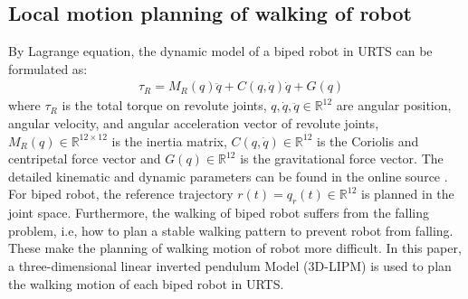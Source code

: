 \documentclass[journal,12pt,onecolumn,draftclsnofoot,]{IEEEtran}
\begin{document}


\subsection{Local motion planning of walking of robot}
By Lagrange equation, the dynamic model of a biped robot in URTS can be formulated as:
\begin{equation} \label{eq:robot} 
    \begin{split}
        & \tau_R = M_R(q)\ddot{q} + C(q,\dot{q})\dot{q} + G(q)    
    \end{split}
\end{equation}
where $\tau_R$ is the total torque on revolute joints, $q,\dot{q},\ddot{q}\in\mathbb{R}^{12}$  are angular position, angular velocity, and angular acceleration vector of revolute joints, $M_R(q)\in\mathbb{R}^{12\times 12}$ is the inertia matrix, $C(q,\dot{q})\in\mathbb{R}^{12}$ is the Coriolis and centripetal force vector and $G(q)\in\mathbb{R}^{12}$ is the gravitational force vector. The detailed kinematic and dynamic parameters can be found in the online source \cite{ourrobot}. For biped robot, the reference trajectory $r(t)=q_r(t)\in\mathbb{R}^{12}$ is planned in the joint space. Furthermore, the walking of biped robot suffers from the falling problem, i.e, how to plan a stable walking pattern to prevent robot from falling. These make the planning of walking motion of robot more difficult. In this paper, a three-dimensional linear inverted pendulum Model (3D-LIPM) \cite{kajita2001real} is used to plan the walking motion of each biped robot in URTS.
\end{document}
